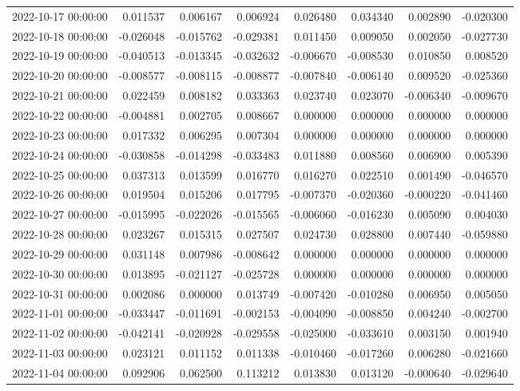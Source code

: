 \begin{tabular}{lrrrrrrr}
2022-10-17 00:00:00 & 0.011537 & 0.006167 & 0.006924 & 0.026480 & 0.034340 & 0.002890 & -0.020300 \\
2022-10-18 00:00:00 & -0.026048 & -0.015762 & -0.029381 & 0.011450 & 0.009050 & 0.002050 & -0.027730 \\
2022-10-19 00:00:00 & -0.040513 & -0.013345 & -0.032632 & -0.006670 & -0.008530 & 0.010850 & 0.008520 \\
2022-10-20 00:00:00 & -0.008577 & -0.008115 & -0.008877 & -0.007840 & -0.006140 & 0.009520 & -0.025360 \\
2022-10-21 00:00:00 & 0.022459 & 0.008182 & 0.033363 & 0.023740 & 0.023070 & -0.006340 & -0.009670 \\
2022-10-22 00:00:00 & -0.004881 & 0.002705 & 0.008667 & 0.000000 & 0.000000 & 0.000000 & 0.000000 \\
2022-10-23 00:00:00 & 0.017332 & 0.006295 & 0.007304 & 0.000000 & 0.000000 & 0.000000 & 0.000000 \\
2022-10-24 00:00:00 & -0.030858 & -0.014298 & -0.033483 & 0.011880 & 0.008560 & 0.006900 & 0.005390 \\
2022-10-25 00:00:00 & 0.037313 & 0.013599 & 0.016770 & 0.016270 & 0.022510 & 0.001490 & -0.046570 \\
2022-10-26 00:00:00 & 0.019504 & 0.015206 & 0.017795 & -0.007370 & -0.020360 & -0.000220 & -0.041460 \\
2022-10-27 00:00:00 & -0.015995 & -0.022026 & -0.015565 & -0.006060 & -0.016230 & 0.005090 & 0.004030 \\
2022-10-28 00:00:00 & 0.023267 & 0.015315 & 0.027507 & 0.024730 & 0.028800 & 0.007440 & -0.059880 \\
2022-10-29 00:00:00 & 0.031148 & 0.007986 & -0.008642 & 0.000000 & 0.000000 & 0.000000 & 0.000000 \\
2022-10-30 00:00:00 & 0.013895 & -0.021127 & -0.025728 & 0.000000 & 0.000000 & 0.000000 & 0.000000 \\
2022-10-31 00:00:00 & 0.002086 & 0.000000 & 0.013749 & -0.007420 & -0.010280 & 0.006950 & 0.005050 \\
2022-11-01 00:00:00 & -0.033447 & -0.011691 & -0.002153 & -0.004090 & -0.008850 & 0.004240 & -0.002700 \\
2022-11-02 00:00:00 & -0.042141 & -0.020928 & -0.029558 & -0.025000 & -0.033610 & 0.003150 & 0.001940 \\
2022-11-03 00:00:00 & 0.023121 & 0.011152 & 0.011338 & -0.010460 & -0.017260 & 0.006280 & -0.021660 \\
2022-11-04 00:00:00 & 0.092906 & 0.062500 & 0.113212 & 0.013830 & 0.013120 & -0.000640 & -0.029640 \\

\end{tabular}
